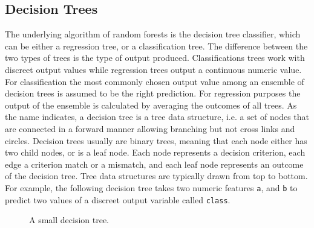 \documentclass[a4paper,man,12pt,apacite,floatsintext,draftfirst]{apa6} %
\begin{document}
\subsection{Decision Trees}

The underlying algorithm of random forests is the decision tree classifier,
which can be either a regression tree, or a classification tree.
The difference between the two types of trees is the type of output produced.
Classifications trees work with discreet output values
while regression trees output a continuous numeric value.
For classification the most commonly chosen output value among an ensemble
of decision trees is assumed to be the right prediction.
For regression purposes the output of the ensemble is calculated by averaging
the outcomes of all trees.
As the name indicates, a decision tree is a tree data structure, i.e.
a set of nodes that are connected in a forward manner allowing branching
but not cross links and circles.
Decision trees usually are binary trees, meaning that each node either has
two child nodes, or is a leaf node.
Each node represents a decision criterion, each edge a criterion match or
a mismatch, and each leaf node represents an outcome of the decision tree.
Tree data structures are typically drawn from top to bottom.
For example, the following decision tree takes two numeric features
\texttt{a}, and \texttt{b} to predict two values of a discreet output variable
called \texttt{class}.

\begin{figure}
\caption{A small decision tree.}
\begin{center}
\end{center}
\end{figure}
\end{document}
